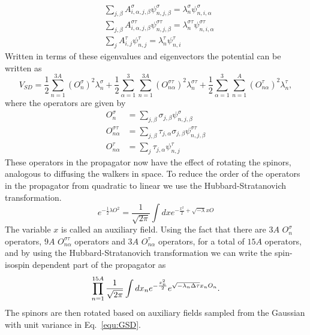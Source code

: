 \begin{align}
   &\sum\limits_{j,\beta} A^{\sigma}_{i,\alpha,j,\beta}\psi^{\sigma}_{n,j,\beta} = \lambda^{\sigma}_n\psi^{\sigma}_{n,i,\alpha} \\
   &\sum\limits_{j,\beta} A^{\sigma\tau}_{i,\alpha,j,\beta}\psi^{\sigma\tau}_{n,j,\beta} = \lambda^{\sigma\tau}_n\psi^{\sigma\tau}_{n,i,\alpha} \\
   &\sum\limits_{j} A^{\tau}_{i,j}\psi^{\tau}_{n,j} = \lambda^{\tau}_n\psi^{\tau}_{n,i}
\end{align}
Written in terms of these eigenvalues and eigenvectors the potential can be written as
\begin{equation}
   V_{SD} = \frac{1}{2}\sum\limits_{n=1}^{3A} \left(O_{n}^{\sigma}\right)^2 \lambda_n^{\sigma}
      + \frac{1}{2}\sum\limits_{\alpha=1}^{3}\sum\limits_{n=1}^{3A} \left(O_{n\alpha}^{\sigma\tau}\right)^2 \lambda_n^{\sigma\tau}
      + \frac{1}{2}\sum\limits_{\alpha=1}^{3}\sum\limits_{n=1}^{A} \left(O_{n\alpha}^{\tau}\right)^2 \lambda_n^{\tau},
\end{equation}
where the operators are given by
\begin{equation}
\begin{split}
   O_{n}^{\sigma} &= \sum\limits_{j,\beta} \sigma_{j,\beta}\psi_{n,j,\beta}^{\sigma} \\
   O_{n\alpha}^{\sigma\tau} &= \sum\limits_{j,\beta} \tau_{j,\alpha}\sigma_{j,\beta}\psi_{n,j,\beta}^{\sigma\tau} \\
   O_{n\alpha}^{\tau} &= \sum\limits_{j} \tau_{j,\alpha}\psi_{n,j}^{\tau}
\end{split}
\end{equation}
These operators in the propagator now have the effect of rotating the spinors, analogous to diffusing the walkers in space. To reduce the order of the operators in the propagator from quadratic to linear we use the Hubbard-Stratanovich transformation.
\begin{equation}
   e^{-\frac{1}{2}\lambda O^2} = \frac{1}{\sqrt{2\pi}} \int dx e^{-\frac{x^2}{2} + \sqrt{-\lambda}x O}
\end{equation}
The variable $x$ is called an auxiliary field. Using the fact that there are $3A$ $O_{n}^{\sigma}$ operators, $9A$ $O_{n\alpha}^{\sigma\tau}$ operators and $3A$ $O_{n\alpha}^{\tau}$ operators, for a total of $15A$ operators, and by using the Hubbard-Stratanovich transformation we can write the spin-isospin dependent part of the propagator as
\begin{equation}
   \prod\limits_{n=1}^{15A}\frac{1}{\sqrt{2\pi}}\int dx_n e^{-\frac{x_n^2}{2}}e^{\sqrt{-\lambda_n\Delta\tau} x_nO_n}.
   \label{equ:GSD}
\end{equation}
The spinors are then rotated based on auxiliary fields sampled from the Gaussian with unit variance in Eq.~\ref{equ:GSD}.
